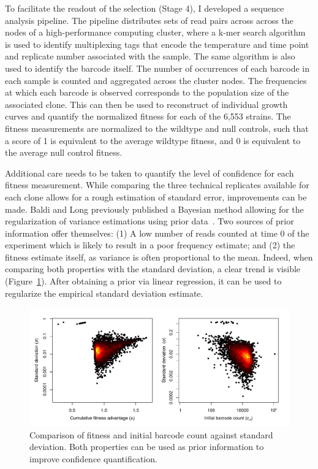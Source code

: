 To facilitate the readout of the selection (Stage 4), I developed a sequence analysis pipeline. The pipeline distributes sets of read pairs across across the nodes of a high-performance computing cluster, where a k-mer search algorithm is used to identify multiplexing tags that encode the temperature and time point and replicate number associated with the sample. The same algorithm is also used to identify the barcode itself. The number of occurrences of each barcode in each sample is counted and aggregated across the cluster nodes. The frequencies at which each barcode is observed corresponds to the population size of the associated clone. This can then be used to reconstruct of individual growth curves and quantify the normalized fitness for each of the 6,553 strains. The fitness measurements are normalized to the wildtype and null controls, such that a score of 1 is equivalent to the average wildtype fitness, and 0 is equivalent to the average null control fitness.

Additional care needs to be taken to quantify the level of confidence for each fitness measurement. While comparing the three technical replicates available for each clone allows for a rough estimation of standard error, improvements can be made. Baldi and Long previously published a Bayesian method allowing for the regularization of variance estimations using prior data~\cite{baldi_bayesian_2001}. Two sources of prior information offer themselves: (1) A low number of reads counted at time 0 of the experiment which is likely to result in a poor frequency estimate; and (2) the fitness estimate itself, as variance is often proportional to the mean. Indeed, when comparing both properties with the standard deviation, a clear trend is visible (Figure~\ref{fig:baldiLong}). After obtaining a prior via linear regression, it can be used to regularize the empirical standard deviation estimate.

\begin{figure}[h!]
	\centering
	\includegraphics[width=\textwidth]{img/baldi_long.pdf}
	\caption{Comparison of fitness and initial barcode count against standard deviation. Both properties can be used as prior information to improve confidence quantification.}
	\label{fig:baldiLong}
\end{figure}



